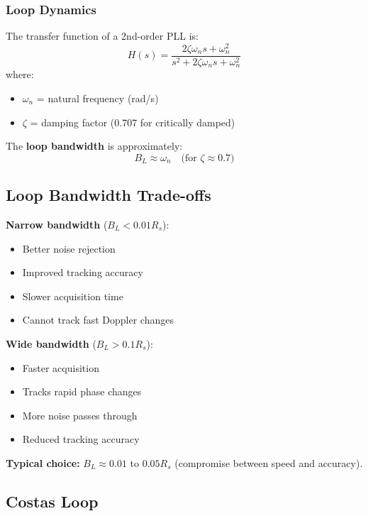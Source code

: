 \subsubsection{Loop Dynamics}

The transfer function of a 2nd-order PLL is:
\begin{equation}
H(s) = \frac{2\zeta\omega_n s + \omega_n^2}{s^2 + 2\zeta\omega_n s + \omega_n^2}
\end{equation}
where:
\begin{itemize}
\item $\omega_n$ = natural frequency (rad/s)
\item $\zeta$ = damping factor (0.707 for critically damped)
\end{itemize}

The \textbf{loop bandwidth} is approximately:
\begin{equation}
B_L \approx \omega_n \quad \text{(for } \zeta \approx 0.7\text{)}
\end{equation}

\subsection{Loop Bandwidth Trade-offs}

\textbf{Narrow bandwidth} ($B_L < 0.01 R_s$):
\begin{itemize}
\item[\checkmark] Better noise rejection
\item[\checkmark] Improved tracking accuracy
\item[\texttimes] Slower acquisition time
\item[\texttimes] Cannot track fast Doppler changes
\end{itemize}

\textbf{Wide bandwidth} ($B_L > 0.1 R_s$):
\begin{itemize}
\item[\checkmark] Faster acquisition
\item[\checkmark] Tracks rapid phase changes
\item[\texttimes] More noise passes through
\item[\texttimes] Reduced tracking accuracy
\end{itemize}

\textbf{Typical choice:} $B_L \approx 0.01$ to $0.05 R_s$ (compromise between speed and accuracy).

\subsection{Costas Loop}

